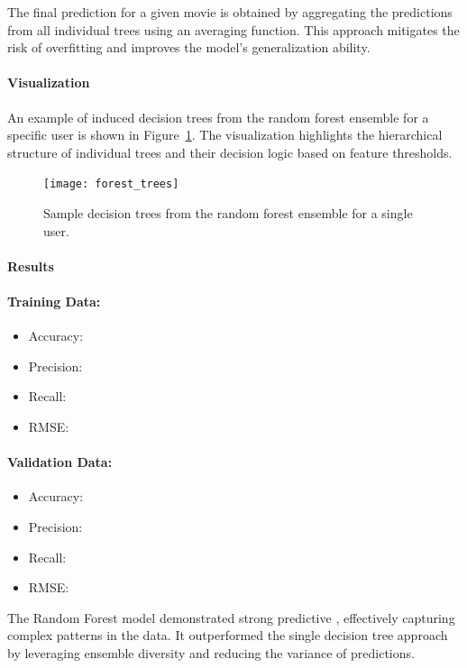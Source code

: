 \documentclass[a4paper,10pt]{article}
\begin{document}
The final prediction for a given movie is obtained by aggregating the predictions from all individual trees using an averaging function. This approach mitigates the risk of overfitting and improves the model's generalization ability.

\paragraph{Visualization}
An example of induced decision trees from the random forest ensemble for a specific user is shown in Figure~\ref{fig:random_forest_trees}. The visualization highlights the hierarchical structure of individual trees and their decision logic based on feature thresholds.

\begin{figure}[h!]
    \centering
    \texttt{[image: forest\_trees]}
    \caption{Sample decision trees from the random forest ensemble for a single user.}
    \label{fig:random_forest_trees}
\end{figure}

\paragraph{Results}
\paragraph{Training Data:}
\begin{itemize}
    \item Accuracy: 
    \item Precision: 
    \item Recall: 
    \item RMSE:
\end{itemize}

\paragraph{Validation Data:}
\begin{itemize}
    \item Accuracy: 
    \item Precision: 
    \item Recall:
    \item RMSE: 
\end{itemize}

The Random Forest model demonstrated strong predictive
, effectively capturing complex patterns in the data.
It outperformed the single decision tree approach by
leveraging ensemble diversity and reducing the variance
of predictions.
\end{document}
